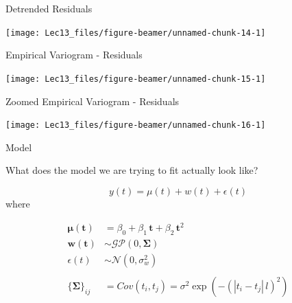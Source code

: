 \documentclass[11pt,ignorenonframetext,]{beamer}
\begin{document}
\begin{frame}{Detrended Residuals}
\protect\hypertarget{detrended-residuals}{}

\begin{center}\texttt{[image: Lec13\_files/figure-beamer/unnamed-chunk-14-1]} \end{center}

\end{frame}

\begin{frame}{Empirical Variogram - Residuals}
\protect\hypertarget{empirical-variogram---residuals}{}

\begin{center}\texttt{[image: Lec13\_files/figure-beamer/unnamed-chunk-15-1]} \end{center}

\end{frame}

\begin{frame}{Zoomed Empirical Variogram - Residuals}
\protect\hypertarget{zoomed-empirical-variogram---residuals}{}

\begin{center}\texttt{[image: Lec13\_files/figure-beamer/unnamed-chunk-16-1]} \end{center}

\end{frame}

\begin{frame}[t]{Model}
\protect\hypertarget{model}{}

What does the model we are trying to fit actually look like?

\pause

\vspace{2mm}

\[ y(t) = \mu(t) + w(t) + \epsilon(t) \] where

\[
\begin{aligned}
\symbf{\mu(t)} &= \beta_0 + \beta_1\, \symbf{t} +\beta_2\, \symbf{t}^2\\
\symbf{w(t)} &\sim \mathcal{GP}(0, \symbf{\Sigma}) \\
\epsilon(t) &\sim \mathcal{N}(0, \sigma^2_w)\\
\\
\{\symbf{\Sigma}\}_{ij} &= Cov(t_i, t_j) =  \sigma^2 \exp(- (|t_i-t_j|\,l)^2)
\end{aligned}
\]

\end{frame}
\end{document}
